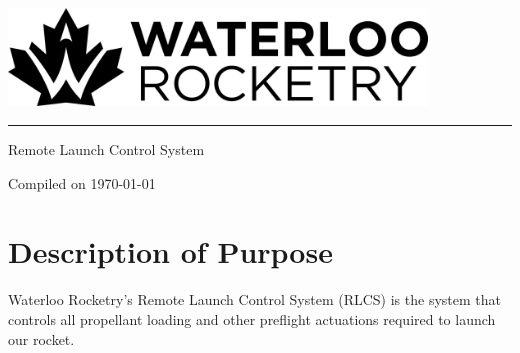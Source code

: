 \documentclass[letter]{article}
\begin{document}
\begin{center}
\vspace*{7cm}
\hspace{7em}\includegraphics[width=30em]{images/mono_horizontal_standard}
\newline
\rule{50em}{2pt}

\vspace{1cm}
\Huge Remote Launch Control System

\vspace*{\fill}
\small Compiled on \today
\end{center}
\newpage
{}

\section{Description of Purpose}
Waterloo Rocketry's Remote Launch Control System (RLCS) is the system that
controls all propellant loading and other preflight actuations required to
launch our rocket.

\end{document}
